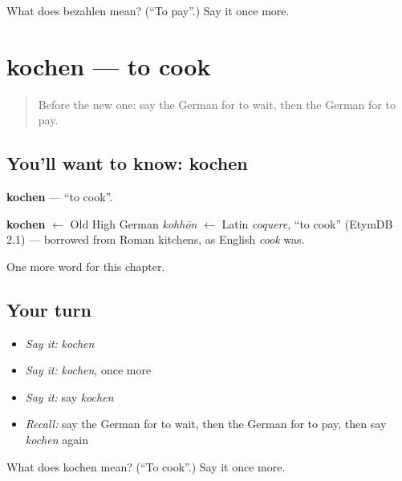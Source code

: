 \begin{tcolorbox}[breakable,colback=teal!4,colframe=teal!35!black,title={Before you move on}]
What does bezahlen mean? (\textquotedblleft{}To pay\textquotedblright{}.) Say it once more.
\end{tcolorbox}
\section[kochen]{kochen — to cook}

\label{lesson:GE-C65-kochen}



\begin{quote}
Before the new one: say the German for to wait, then the German for to pay.
\end{quote}

\subsection*{You'll want to know: kochen}
\textbf{kochen} — \textquotedblleft{}to cook\textquotedblright{}.

\begin{cousinweb}
\textbf{kochen} $\leftarrow$ Old High German \emph{kohhōn} $\leftarrow$ Latin \emph{coquere}, \textquotedblleft{}to cook\textquotedblright{} (EtymDB 2.1) — borrowed from Roman kitchens, as English \emph{cook} was.
\end{cousinweb}

\begin{grammarlens}[title={What you've built}]
One more word for this chapter.
\end{grammarlens}

\subsection*{Your turn}
\begin{itemize}
\raggedright
  \item \emph{Say it:} \emph{kochen}
  \item \emph{Say it:} \emph{kochen}, once more
  \item \emph{Say it:} say \emph{kochen}
  \item \emph{Recall:} say the German for to wait, then the German for to pay, then say \emph{kochen} again
\end{itemize}

\begin{tcolorbox}[breakable,colback=teal!4,colframe=teal!35!black,title={Before you move on}]
What does kochen mean? (\textquotedblleft{}To cook\textquotedblright{}.) Say it once more.
\end{tcolorbox}
